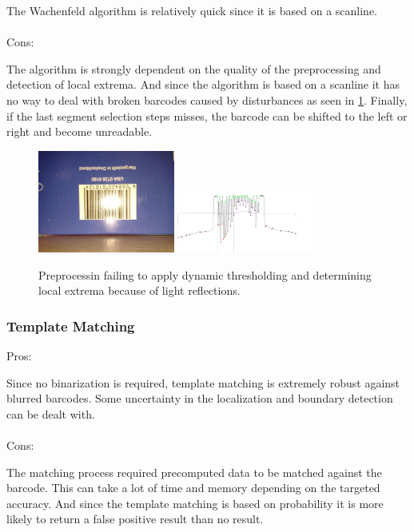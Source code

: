 The Wachenfeld algorithm is relatively quick since it is based on a scanline.
\\
\\
Cons:

The algorithm is strongly dependent on the quality of the preprocessing and detection of local extrema. And since the algorithm is based on a scanline it has no way to deal with broken barcodes caused by disturbances as seen in \cref{failwachenfeld}. Finally, if the last segment selection steps misses, the barcode can be shifted to the left or right and become unreadable.

\begin{figure}[t]
\center
\includegraphics[width=0.4\textwidth,natwidth=800,natheight=600]{img/wachenfeldfail.jpg}
\hspace{1cm}
\includegraphics[width=0.4\textwidth,natwidth=1800,natheight=800]{img/wachenfeldfail2.jpg}
\caption{Preprocessin failing to apply dynamic thresholding and determining local extrema because of light reflections.}
\label{failwachenfeld}
\end{figure}
 
\subsubsection*{Template Matching}
Pros:

Since no binarization is required, template matching is extremely robust against
blurred barcodes. Some uncertainty in the localization and boundary detection
can be dealt with.
\\
\\
Cons:

The matching process required precomputed data to be matched against the barcode. This can take a lot of time and memory depending on the targeted accuracy. And since the template matching is based on probability it is more likely to return a false positive result than no result.

